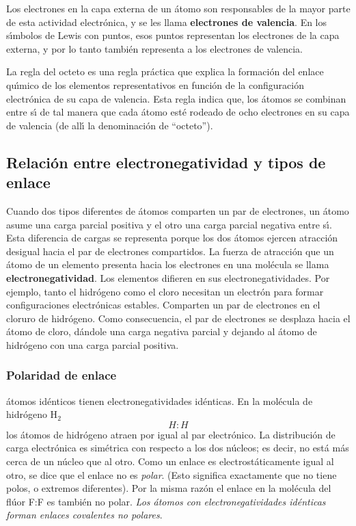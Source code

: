 Los electrones en la capa externa de un \'atomo son responsables de la mayor parte de esta actividad electr\'onica, y se les llama \textbf{electrones de \gls{valencia}}. En los s\'{\i}mbolos de Lewis con puntos, esos puntos representan los electrones de la capa externa, y por lo tanto tambi\'en representa a los electrones de valencia.

La regla del octeto es una regla pr\'actica que explica la formaci\'on del enlace qu\'{\i}mico de los elementos representativos en funci\'on de la configuraci\'on electr\'onica de su capa de valencia. Esta regla indica que, los \'atomos se combinan entre s\'{\i} de tal manera que cada \'atomo est\'e rodeado de ocho electrones en su capa de valencia (de all\'{\i} la denominaci\'on de ``octeto'').

\subsection[Electronegatividad y tipos de enlace]{Relaci\'on entre electronegatividad y tipos de enlace}


Cuando dos tipos diferentes de \'atomos comparten un par de electrones, un  \'atomo asume una carga parcial positiva y el otro una carga parcial negativa
entre s\'{\i}. Esta diferencia de cargas se representa porque los dos \'atomos  ejercen atracci\'on desigual hacia el par de electrones compartidos. La fuerza
de atracci\'on que un \'atomo de un elemento presenta hacia los electrones en  una mol\'ecula se llama \textbf{\gls{electronegatividad}}.
 Los elementos difieren en sus electronegatividades. Por ejemplo, tanto el hidr\'ogeno como el cloro necesitan un electr\'on para formar
configuraciones electr\'onicas estables. Comparten un par de electrones en el cloruro de hidr\'ogeno. Como consecuencia, el par de electrones se desplaza hacia el
\'atomo de cloro, d\'andole una carga negativa parcial y dejando al \'atomo de hidr\'ogeno con una carga parcial positiva.

\subsubsection{Polaridad de enlace}
\'atomos id\'enticos tienen electronegatividades id\'enticas. En la mol\'ecula
de hidr\'ogeno H$_2$  $$H:H$$ los \'atomos de hidr\'ogeno atraen por igual al par
electr\'onico. La distribuci\'on de carga electr\'onica es sim\'etrica con respecto
a los dos n\'ucleos; es decir, no est\'a m\'as cerca de un n\'ucleo que al otro. 
Como un enlace es e\-lec\-trost\'aticamente igual al otro, se dice que el enlace no
es \textit{polar}.  (Esto significa
exactamente que no tiene polos, o extremos diferentes). Por la misma raz\'on el
enlace  en la mol\'ecula del fl\'uor F:F es tambi\'en no polar. \textit{Los \'atomos
con electronegatividades id\'enticas forman enlaces covalentes no polares}.

